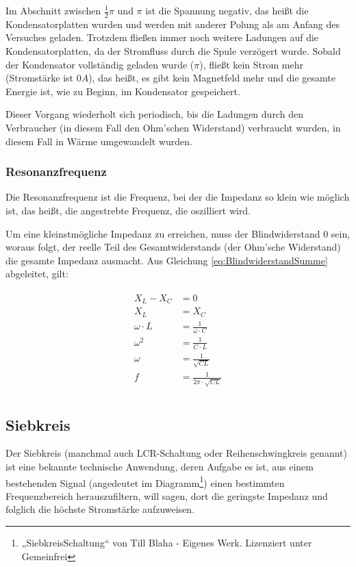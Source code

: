 Im Abschnitt zwischen $\frac{1}{2}\pi$ und $\pi$ ist die Spannung negativ, das heißt die Kondensatorplatten wurden und werden mit anderer Polung als am Anfang des Versuches geladen. Trotzdem fließen immer noch weitere Ladungen auf die Kondensatorplatten, da der Stromfluss durch die Spule verzögert wurde. Sobald der Kondensator vollständig geladen wurde ($\pi$), fließt kein Strom mehr (Stromstärke ist $0A$), das heißt, es gibt kein Magnetfeld mehr und die gesamte Energie ist, wie zu Beginn, im Kondensator gespeichert.

Dieser Vorgang wiederholt sich periodisch, bis die Ladungen durch den Verbraucher (in diesem Fall den Ohm'schen Widerstand) verbraucht wurden, in diesem Fall in Wärme umgewandelt wurden.

\subsubsection{Resonanzfrequenz}

Die Resonanzfrequenz ist die Frequenz, bei der die Impedanz so klein wie möglich ist, das heißt, die angestrebte Frequenz, die oszilliert wird.

Um eine kleinstmögliche Impedanz zu erreichen, muss der Blindwiderstand $0$ sein, woraus folgt, der reelle Teil des Gesamtwiderstands (der Ohm'sche Widerstand) die gesamte Impedanz ausmacht. Aus Gleichung \ref{eq:BlindwiderstandSumme} abgeleitet, gilt:

\begin{align}	\label{eq:ResonanzfrequenzSchwingkreis}
\begin{split}
	X_L - X_C &= 0 \\
	X_L &= X_C \\
	\omega \cdot L &= \frac{1}{\omega \cdot C} \\
	\omega ^2 &= \frac{1}{C \cdot L} \\
	\omega &= \frac{1}{\sqrt{C L}} \\	
	f &= \frac{1}{2 \pi \cdot \sqrt{C L}} \\
\end{split}
\end{align}


\subsection{Siebkreis} \label{subsec:Siebkreis}

Der Siebkreis (manchmal auch LCR-Schaltung oder Reihenschwingkreis genannt) ist eine bekannte technische Anwendung, deren Aufgabe es ist, aus einem bestehenden Signal (angedeutet im Diagramm\footnote{„SiebkreisSchaltung“ von Till Blaha - Eigenes Werk. Lizenziert unter Gemeinfrei}) einen bestimmten Frequenzbereich \glqq herauszufiltern\grqq , will sagen, dort die geringste Impedanz und folglich die höchste Stromstärke aufzuweisen.

